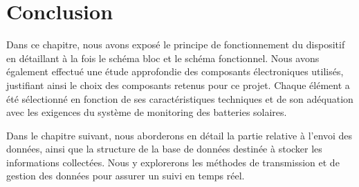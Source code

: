 






\section{Conclusion}

Dans ce chapitre, nous avons exposé le principe de fonctionnement du dispositif en détaillant à la fois le schéma bloc et le schéma fonctionnel. Nous avons également effectué une étude approfondie des composants électroniques utilisés, justifiant ainsi le choix des composants retenus pour ce projet. Chaque élément a été sélectionné en fonction de ses caractéristiques techniques et de son adéquation avec les exigences du système de monitoring des batteries solaires.

Dans le chapitre suivant, nous aborderons en détail la partie relative à l’envoi des données, ainsi que la structure de la base de données destinée à stocker les informations collectées. Nous y explorerons les méthodes de transmission et de gestion des données pour assurer un suivi en temps réel.
